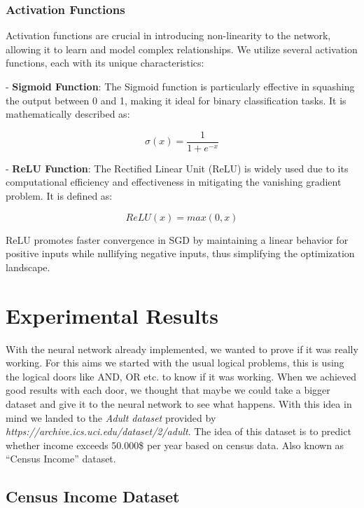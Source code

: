 \documentclass{article}
\begin{document}
\subsubsection{Activation Functions}

Activation functions are crucial in introducing non-linearity to the network, allowing it to learn and model complex relationships. We utilize several activation functions, each with its unique characteristics:

- \textbf{Sigmoid Function}: The Sigmoid function is particularly effective in squashing the output between 0 and 1, making it ideal for binary classification tasks. It is mathematically described as:

\begin{equation}
    \sigma(x) = \frac{1}{1 + e^{-x}}
\end{equation}

- \textbf{ReLU Function}: The Rectified Linear Unit (ReLU) is widely used due to its computational efficiency and effectiveness in mitigating the vanishing gradient problem. It is defined as:

\begin{equation}
    ReLU(x) = max(0, x)
\end{equation}

ReLU promotes faster convergence in SGD by maintaining a linear behavior for positive inputs while nullifying negative inputs, thus simplifying the optimization landscape.

\section{Experimental Results}

With the neural network already implemented, we wanted to prove if it was really working. For this aims we started with the usual logical problems, this is using the logical doors like AND, OR etc. to know if it was working. When we achieved good results with each door, we thought that maybe we could take a bigger dataset and give it to the neural network to see what happens. With this idea in mind we landed to the \textit{Adult dataset} provided by \textit{https://archive.ics.uci.edu/dataset/2/adult}. The idea of this dataset is to predict whether income exceeds 50.000\$ per year based on census data. Also known as ``Census Income'' dataset.

\subsection{Census Income Dataset}
\end{document}
